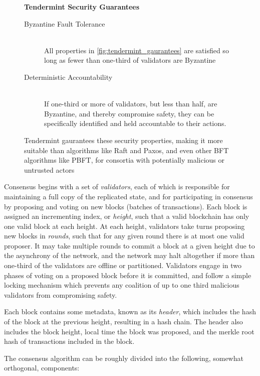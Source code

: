 \begin{figure}[]
	\textbf{Tendermint Security Guarantees}
	\begin{description}
	  \item[Byzantine Fault Tolerance] \hfill \\
		All properties in \ref{fig:tendermint_gaurantees} are satisfied so long as fewer than one-third of validators are Byzantine
	  \item[Deterministic Accountability] \hfill \\
		If one-third or more of validators, but less than half, are Byzantine, and thereby compromise safety, 
		they can be specifically identified and held accountable to their actions.
	\end{description}
	\label{fig:tendermint_security}
  \caption{Tendermint gaurantees these security properties, making it more suitable than algorithms like Raft and Paxos, and even other BFT algorithms like PBFT, for consortia with potentially malicious or untrusted actors}
\end{figure}


Consensus begins with a set of \emph{validators}, each of which is responsible for maintaining a full copy of the replicated state,
and for participating in consensus by proposing and voting on new blocks (batches of transactions).
Each block is assigned an incrementing index, or \emph{height}, such that a valid blockchain has only one valid block at each height.
At each height, validators take turns proposing new blocks in \emph{rounds}, such that for any given round there is at most one valid proposer.
It may take multiple rounds to commit a block at a given height due to the asynchrony of the network,
and the network may halt altogether if more than one-third of the validators are offline or partitioned.
Validators engage in two phases of voting on a proposed block before it is committed, 
and follow a simple locking mechanism which prevents any coalition of up to one third malicious validators from compromising safety.

Each block contains some metadata, known as its \emph{header}, which includes the hash of the block at the previous height, resulting in a hash chain.
The header also includes the block height, local time the block was proposed, and the merkle root hash of transactions included in the block.

The consensus algorithm can be roughly divided into the following, somewhat orthogonal, components:


